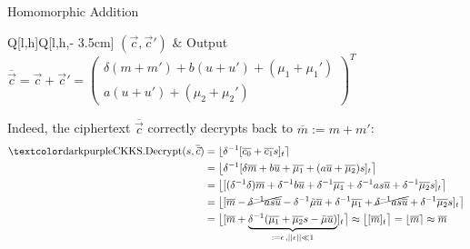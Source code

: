 \begin{frame}{Homomorphic Addition}
  \begin{tblr}{Q[l,h]Q[l,h,\textwidth - 3.5cm]}
    $(\vec{c}, \vec{c}')$ & {
        Output $\overline{\vec{c}} = \vec{c} + \vec{c}' = \begin{pmatrix}
            \delta (m + m') + b (u + u') + (\mu_1 + \mu_1') \\
            a (u + u') + (\mu_2 + \mu_2')
          \end{pmatrix}^T$} \\
  \end{tblr}

  Indeed, the ciphertext $\overline{\vec{c}}$ correctly decrypts back to $\overline{m} := m + m'$:
  \begin{align*}
    \cryptop{CKKS.Decrypt}(s, \overline{\vec{c}})
     & = \lfloor \delta\inv [\overline{c_0} + \overline{c_1} s]_t \rceil                                                                                                                                                         \\
     & = \big\lfloor \delta\inv [\delta \overline{m} + b \overline{u} + \overline{\mu_1} + (a \overline{u} + \overline{\mu_2}) s]_t \big\rceil                                                                                   \\
     & = \big\lfloor [(\delta\inv\delta) \overline{m} + \delta\inv b \overline{u} + \delta\inv \overline{\mu_1} + \delta\inv a s \overline{u} + \delta\inv \overline{\mu_2} s]_t \big\rceil                                      \\
     & = \big\lfloor [\overline{m} - \cancel{\delta\inv as \overline{u}} - \delta\inv \tilde{\mu} \overline{u} + \delta\inv \overline{\mu_1} + \cancel{\delta\inv as \overline{u}} + \delta\inv \overline{\mu_2} s]_t \big\rceil \\
     & = \big\lfloor [\overline{m} + \underbrace{\delta\inv (\overline{\mu_1} + \overline{\mu_2} s - \tilde{\mu} \overline{u})}_{:= \epsilon \,, ||\epsilon|| \ll 1}]_t \big\rceil
    \approx \big\lfloor [\overline{m}]_t \big\rceil = \lfloor \overline{m} \rceil \approx \overline{m}
  \end{align*}
\end{frame}
